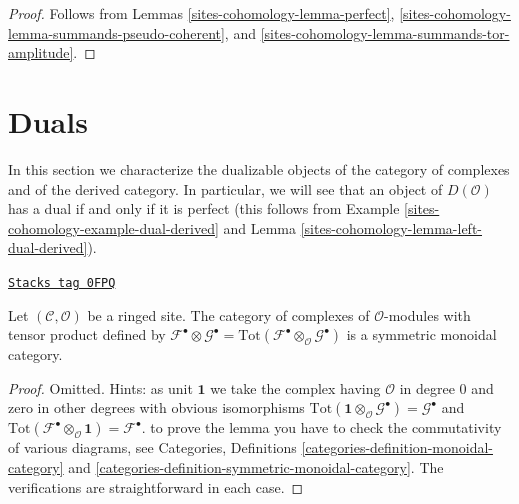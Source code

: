 \begin{proof}
Follows from
Lemmas \ref{sites-cohomology-lemma-perfect}, \ref{sites-cohomology-lemma-summands-pseudo-coherent}, and
\ref{sites-cohomology-lemma-summands-tor-amplitude}.
\end{proof}

\section{Duals}
\label{sites-cohomology-section-duals}
In this section we characterize the dualizable objects of
the category of complexes and of the derived category.
In particular, we will see that an object of $D(\mathcal{O})$
has a dual if and only if it is perfect (this follows from
Example \ref{sites-cohomology-example-dual-derived} and
Lemma \ref{sites-cohomology-lemma-left-dual-derived}).

\begin{lemma}
\label{sites-cohomology-lemma-symmetric-monoidal-cat-complexes}
\href{https://stacks.math.columbia.edu/tag/0FPQ}{\texttt{Stacks tag 0FPQ}}

Let $(\mathcal{C}, \mathcal{O})$ be a ringed site. The category of complexes
of $\mathcal{O}$-modules with tensor product defined by
$\mathcal{F}^\bullet \otimes \mathcal{G}^\bullet =
\text{Tot}(\mathcal{F}^\bullet \otimes_\mathcal{O} \mathcal{G}^\bullet)$
is a symmetric monoidal category.
\end{lemma}

\begin{proof}
Omitted. Hints: as unit $\mathbf{1}$ we take the complex having
$\mathcal{O}$ in degree $0$ and zero in other degrees with
obvious isomorphisms
$\text{Tot}(\mathbf{1} \otimes_\mathcal{O} \mathcal{G}^\bullet) =
\mathcal{G}^\bullet$ and
$\text{Tot}(\mathcal{F}^\bullet \otimes_\mathcal{O} \mathbf{1}) =
\mathcal{F}^\bullet$.
to prove the lemma you have to check the commutativity
of various diagrams, see Categories, Definitions
\ref{categories-definition-monoidal-category} and
\ref{categories-definition-symmetric-monoidal-category}.
The verifications are straightforward in each case.
\end{proof}


